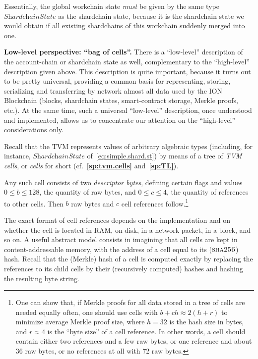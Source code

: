 \documentclass[12pt,oneside]{article}
\def\makepoint#1{\medbreak\noindent{\bf #1.\ }}
\def\nxsubpoint{\refstepcounter{subsubsection}%
  \smallbreak\makepoint{\thesubsubsection}}
\def\refpoint#1{{\rm\textbf{\ref{#1}}}}
\let\ptref=\refpoint
\def\embt(#1.){\textbf{#1.}}
\let\tp=\textit
\def\opsc#1{\operatorname{\textsc{#1}}}
\def\Sha{\opsc{sha256}}
\begin{document}
Essentially, the global workchain state {\em must\/} be given by the
same type $\tp{ShardchainState}$ as the shardchain state, because it
is the shardchain state we would obtain if all existing shardchains of
this workchain suddenly merged into one.

\nxsubpoint\label{sp:bag.of.cells} \embt(Low-level perspective: ``bag
of cells''.)  There is a ``low-level'' description of the
account-chain or shardchain state as well, complementary to the
``high-level'' description given above. This description is quite
important, because it turns out to be pretty universal, providing a
common basis for representing, storing, serializing and transferring
by network almost all data used by the ION Blockchain (blocks,
shardchain states, smart-contract storage, Merkle proofs, etc.). At
the same time, such a universal ``low-level'' description, once
understood and implemented, allows us to concentrate our attention on
the ``high-level'' considerations only.

Recall that the TVM represents values of arbitrary algebraic types
(including, for instance, $\tp{ShardchainState}$
of~\eqref{eq:simple.shard.st}) by means of a tree of {\em TVM cells},
or {\em cells\/} for short (cf.~\ptref{sp:tvm.cells}
and~\ptref{sp:TL}).

Any such cell consists of two {\em descriptor bytes}, defining certain
flags and values $0\leq b\leq 128$, the quantity of raw bytes, and
$0\leq c\leq 4$, the quantity of references to other cells. Then $b$
raw bytes and $c$ cell references follow.\footnote{One can show that, if Merkle proofs for all data stored in a tree of cells are needed equally often, one should use cells with $b+ch\approx 2(h+r)$ to minimize average Merkle proof size, where $h=32$ is the hash size in bytes, and $r\approx4$ is the ``byte size'' of a cell reference. In other words, a cell should contain either two references and a few raw bytes, or one reference and about 36 raw bytes, or no references at all with 72 raw bytes.}

The exact format of cell references depends on the implementation and
on whether the cell is located in RAM, on disk, in a network packet,
in a block, and so on. A useful abstract model consists in imagining
that all cells are kept in content-addressable memory, with the
address of a cell equal to its ($\Sha$) hash. Recall that the (Merkle)
hash of a cell is computed exactly by replacing the references to its
child cells by their (recursively computed) hashes and hashing the
resulting byte string.
\end{document}
